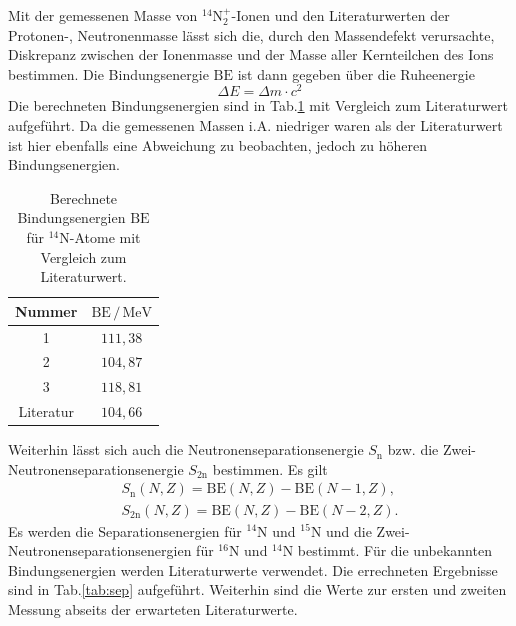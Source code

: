 \documentclass[numbers=noenddot,a4paper,notitlepage,twoside,BCOR15mm]{scrartcl}
\begin{document}
		Mit der gemessenen Masse von $^{14}$N$^+_2$-Ionen und den Literaturwerten der Protonen-, Neutronenmasse lässt sich die, durch den Massendefekt verursachte, Diskrepanz zwischen der Ionenmasse und der Masse aller Kernteilchen des Ions bestimmen. Die Bindungsenergie $\mathrm{BE}$ ist dann gegeben über die Ruheenergie
			\begin{equation}
				\Delta E = \Delta m\cdot c^2
			\end{equation}
		Die berechneten Bindungsenergien sind in Tab.\ref{tab:bind} mit Vergleich zum Literaturwert aufgeführt. Da die gemessenen Massen i.A. niedriger waren als der Literaturwert ist hier ebenfalls eine Abweichung zu beobachten, jedoch zu höheren Bindungsenergien.
		\begin{table}[h]
			\centering
			\caption{Berechnete Bindungsenergien $\mathrm{BE}$ für $^{14}$N-Atome mit Vergleich zum Literaturwert.}
			\begin{tabular}{c|c} 
				
				Nummer & $\mathrm{BE}\,/\,\mathrm{MeV}$ \\ \hline
				1 & $111,38$ \\
				2 & $104,87$ \\
				3 & $118,81$ \\
				Literatur & $104,66$
			\end{tabular}
			\label{tab:bind}
		\end{table}
		Weiterhin lässt sich auch die Neutronenseparationsenergie $S_\mathrm{n}$ bzw. die Zwei-Neutronenseparationsenergie $S_\mathrm{2n}$ bestimmen. Es gilt
		\begin{align}
			S_\mathrm{n}(N,Z) = \mathrm{BE}(N,Z) - \mathrm{BE}(N-1,Z), \nonumber \\
			S_\mathrm{2n}(N,Z) = \mathrm{BE}(N,Z) - \mathrm{BE}(N-2,Z).
		\end{align}
		Es werden die Separationsenergien für $^{14}$N und $^{15}$N und die Zwei-Neutronenseparationsenergien für $^{16}$N und $^{14}$N bestimmt. Für die unbekannten Bindungsenergien werden Literaturwerte verwendet. Die errechneten Ergebnisse sind in Tab.\ref{tab:sep} aufgeführt. Weiterhin sind die Werte zur ersten und zweiten Messung abseits der erwarteten Literaturwerte.
\end{document}

